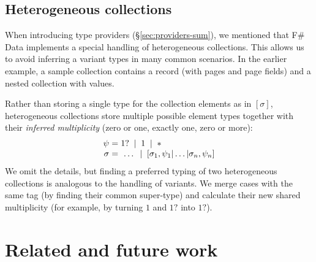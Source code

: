 \documentclass[10pt,preprint,blind,clearpagebib]{sigplanconf}
\newcommand{\strf}[1]{\textnormal{\textcolor{strclr}{\sffamily #1}}}
\newcommand{\lsep}[0]{\;\; | \;\;}
\newcommand{\narrow}[1]{\hspace{-0.7em} #1 \hspace{-0.7em}}
\begin{document}

\subsection{Heterogeneous collections} 
\label{sec:impl-hetero}

When introducing type providers (\S\ref{sec:providers-sum}), we mentioned that F\# Data 
implements a special handling of heterogeneous collections. This allows us to avoid inferring a 
variant types in many common scenarios. In the earlier example, a sample collection 
contains a record (with \strf{pages} and \strf{page} fields) and a nested collection with values.

Rather than storing a single type for the collection elements as in $[\sigma]$, heterogeneous
collections store multiple possible element types together with their \emph{  inferred multiplicity} 
(zero or one, exactly one, zero or more):
%
\begin{equation*}
\begin{array}{rcl}
 \psi &\narrow{=}& 1? \lsep 1 \lsep \ast \\
 \sigma &\narrow{=}& ~\ldots \lsep [\sigma_1, \psi_1 | \ldots | \sigma_n, \psi_n ]
\end{array}
\end{equation*}
%
We omit the details, but finding a preferred typing of two heterogeneous 
collections is analogous to the handling of variants. We merge cases with the same tag (by finding 
their common super-type) and calculate their new shared multiplicity (for example, by turning 
$1$ and $1?$ into $1?$).



%
%

\section{Related and future work}
\label{sec:related}
\end{document}
